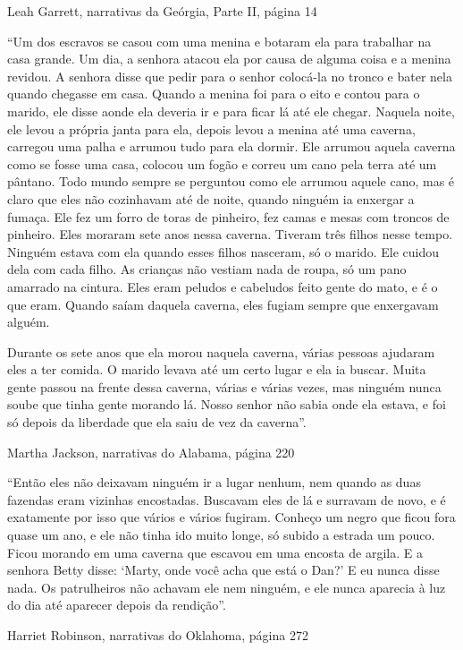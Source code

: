 Leah Garrett, narrativas da Geórgia, Parte II, página 14

``Um dos escravos se casou com uma menina e botaram ela para trabalhar
na casa grande. Um dia, a senhora atacou ela por causa de alguma coisa e
a menina revidou. A senhora disse que pedir para o senhor colocá-la no
tronco e bater nela quando chegasse em casa. Quando a menina foi para o
eito e contou para o marido, ele disse aonde ela deveria ir e para ficar
lá até ele chegar. Naquela noite, ele levou a própria janta para ela,
depois levou a menina até uma caverna, carregou uma palha e arrumou tudo
para ela dormir. Ele arrumou aquela caverna como se fosse uma casa,
colocou um fogão e correu um cano pela terra até um pântano. Todo mundo
sempre se perguntou como ele arrumou aquele cano, mas é claro que eles
não cozinhavam até de noite, quando ninguém ia enxergar a fumaça. Ele
fez um forro de toras de pinheiro, fez camas e mesas com troncos de
pinheiro. Eles moraram sete anos nessa caverna. Tiveram três filhos
nesse tempo. Ninguém estava com ela quando esses filhos nasceram, só o
marido. Ele cuidou dela com cada filho. As crianças não vestiam nada de
roupa, só um pano amarrado na cintura. Eles eram peludos e cabeludos
feito gente do mato, e é o que eram. Quando saíam daquela caverna, eles
fugiam sempre que enxergavam alguém.

Durante os sete anos que ela morou naquela caverna, várias pessoas
ajudaram eles a ter comida. O marido levava até um certo lugar e ela ia
buscar. Muita gente passou na frente dessa caverna, várias e várias
vezes, mas ninguém nunca soube que tinha gente morando lá. Nosso senhor
não sabia onde ela estava, e foi só depois da liberdade que ela saiu de
vez da caverna''.

Martha Jackson, narrativas do Alabama, página 220

``Então eles não deixavam ninguém ir a lugar nenhum, nem quando as duas
fazendas eram vizinhas encostadas. Buscavam eles de lá e surravam de
novo, e é exatamente por isso que vários e vários fugiram. Conheço um
negro que ficou fora quase um ano, e ele não tinha ido muito longe, só
subido a estrada um pouco. Ficou morando em uma caverna que escavou em
uma encosta de argila. E a senhora Betty disse: `Marty, onde você acha
que está o Dan?' E eu nunca disse nada. Os patrulheiros não achavam ele
nem ninguém, e ele nunca aparecia à luz do dia até aparecer depois da
rendição''.

Harriet Robinson, narrativas do Oklahoma, página 272

